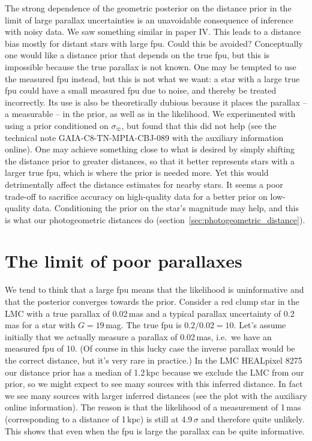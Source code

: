 \documentclass[twocolumn]{aastex62}
\providecommand{\gmag}{\ensuremath{G}}
\providecommand{\sigparallax}{\ensuremath{\sigma_{\varpi}}}
\begin{document}
The strong dependence of the geometric posterior on the distance prior in the limit of large parallax uncertainties is an unavoidable consequence of inference with noisy data. We saw something similar in paper IV. 
This leads to a distance bias mostly for distant stars with large fpu. Could this be avoided? Conceptually one would like a distance prior that depends on the true fpu, but this is impossible because the true parallax is not known. One may be tempted to use the measured fpu instead, but this is not what we want: a star with a large true fpu could have a small measured fpu due to noise, and thereby be treated incorrectly. Its use is also be theoretically dubious because it places the parallax -- a measurable -- in the prior, as well as in the likelihood. 
We experimented with using a prior conditioned on \sigparallax, but found that this did not help (see the technical note GAIA-C8-TN-MPIA-CBJ-089 with the auxiliary information online).
One may achieve something close to what is desired by simply shifting the distance prior to greater distances, so that it better represents stars with a larger true fpu, which is where the prior is needed more. 
Yet this would detrimentally affect the distance estimates for nearby stars. It seems a poor trade-off to sacrifice accuracy on high-quality data for a better prior on low-quality data. 
Conditioning the prior on the star's magnitude may help, and this is what our photogeometric distances do (section~\ref{sec:photogeometric_distance}).


\section{The limit of poor parallaxes}\label{sec:poor_parallax_limit}

We tend to think that a large fpu means that the likelihood is uninformative and that the posterior converges towards the prior. Consider a red clump star in the LMC with a true parallax of 0.02\,mas and a typical parallax uncertainty of 0.2\,mas for a star with $\gmag = 19$\,mag. The true fpu is $0.2/0.02=10$. Let's assume initially that we actually measure a parallax of 0.02\,mas, i.e.\ we have an measured fpu of 10.
(Of course in this lucky case the inverse parallax would be the correct distance, but it's very rare in practice.)
In the LMC HEALpixel 8275 our distance prior has a median of 1.2\,kpc because we exclude the LMC from our prior, so we might expect to see many sources with this inferred distance. In fact we see many sources with larger inferred distances (see the plot with the auxiliary online information). The reason is that the likelihood of a measurement of 1\,mas (corresponding to a distance of 1\,kpc) is still at 4.9\,$\sigma$ and therefore quite unlikely. This shows that even when the fpu is large the parallax can be quite informative. 
\end{document}
